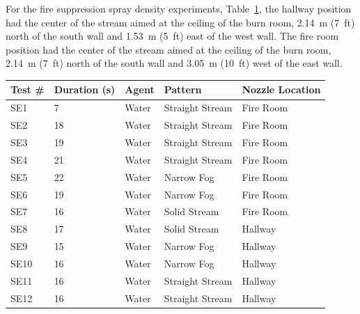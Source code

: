\documentclass[12pt,oneside]{book}
\begin{document}
For the fire suppression spray density experiments, Table~\ref{tab:spray_density_tests2}, the hallway position had the center of the stream aimed at the ceiling of the burn room, 2.14~m (7~ft) north of the south wall and 1.53~m (5~ft) east of the west wall. The fire room position had the center of the stream aimed at the ceiling of the burn room, 2.14~m (7~ft) north of the south wall and 3.05~m (10~ft) west of the east wall.

\begin{table}[!ht]
\footnotesize
\centering
{}\label{tab:spray_density_tests2}
\begin{tabular}{lllll}
\toprule[1.5pt]
Test \#    & Duration (s)  & Agent  &  Pattern            & Nozzle Location  	\\
\midrule
SE1        & 7             & Water  &  Straight Stream    &    Fire Room          \\
SE2        & 18            & Water  &  Straight Stream    &    Fire Room          \\
SE3        & 19            & Water  &  Straight Stream    &    Fire Room          \\
SE4        & 21            & Water  &  Straight Stream    &    Fire Room          \\
SE5        & 22            & Water  &  Narrow Fog  		  &    Fire Room          \\
SE6        & 19            & Water  &  Narrow Fog   	  &    Fire Room          \\
SE7        & 16            & Water  &  Solid Stream       &    Fire Room          \\
SE8        & 17            & Water  &  Solid Stream       &    Hallway            \\
SE9        & 15            & Water  &  Narrow Fog   	  &    Hallway            \\
SE10       & 16            & Water  &  Narrow Fog   	  &    Hallway            \\
SE11       & 16            & Water  &  Straight Stream    &    Hallway            \\
SE12       & 16            & Water  &  Straight Stream    &    Hallway            \\
\bottomrule[1.25pt]
\end{tabular}\par
\end{table}

\clearpage
\end{document}
